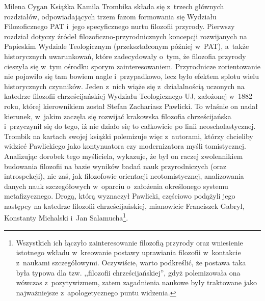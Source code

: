 \begin{newrevplenv}{Milena Cygan}
Książka Kamila Trombika składa się z~trzech głównych rozdziałów, odpowiadających trzem fazom formowania się Wydziału Filozoficznego PAT i~jego specyficznego nurtu filozofii przyrody. Pierwszy rozdział dotyczy źródeł filozoficzno-przyrodnicznych koncepcji rozwijanych na Papieskim Wydziale Teologicznym (przekształconym później w~PAT), a~także historycznych uwarunkowań, które zadecydowały o~tym, że filozofia przyrody cieszyła się w~tym ośrodku sporym zainteresowaniem. Przyrodnicze zorientowanie nie pojawiło się tam bowiem nagle i~przypadkowo, lecz było efektem splotu wielu historycznych czynników. Jeden z~nich wiąże się z~działalnością uczonych na katedrze filozofii chrześcijańskiej Wydziału Teologicznego UJ, założonej w~1882 roku, której kierownikiem został Stefan Zachariasz Pawlicki. To właśnie on nadał kierunek, w~jakim zaczęła się rozwijać krakowska filozofia chrześcijańska i~przyczynił się do tego, iż nie działo się to całkowicie po linii neoscholastycznej. Trombik na kartach swojej książki polemizuje więc z~autorami, którzy chcieliby widzieć Pawlickiego jako kontynuatora czy modernizatora myśli tomistycznej. Analizując dorobek tego myśliciela, wykazuje, że był on raczej zwolennikiem budowania filozofii na bazie wyników badań nauk przyrodniczych (oraz introspekcji), nie zaś, jak filozofowie orientacji neotomistycznej, analizowania danych nauk szczegółowych w~oparciu o~założenia określonego systemu metafizycznego. Drogą, którą wyznaczył Pawlicki, częściowo podążyli jego następcy na katedrze filozofii chrześcijańskiej, mianowicie Franciszek Gabryl, Konstanty Michalski i~Jan Salamucha\footnote{Wszystkich ich łączyło zainteresowanie filozofią przyrody oraz wniesienie istotnego wkładu w~kreowanie postawy uprawiania filozofii w~kontakcie z~naukami szczegółowymi. Oczywiście, warto podkreślić, że postawa taka była typowa dla tzw. ,,filozofii chrześcijańskiej'', gdyż polemizowała ona wówczas z~pozytywizmem, zatem zagadnienia naukowe były traktowane jako najważniejsze z~apologetycznego puntu widzenia.}.


\end{newrevplenv}

